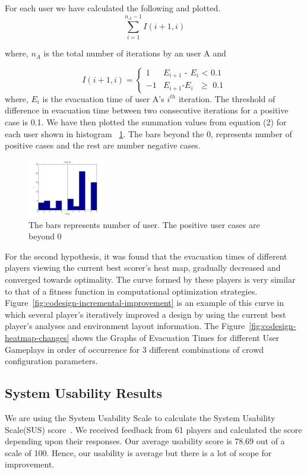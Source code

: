For each user we have calculated the following and plotted.
    \begin{equation}
\sum_{i=1}^{n_{A}-1} I(i+1,i)
 \end{equation}
    
    where, $n_{A}$ is the total number of iterations by an user A and
    
    \begin{equation*}
I(i+1,i) = \begin{cases}
1 &\text{$E_{i+1}$ - $E_{i}$ < 0.1}\  \\  -1 &\text{$E_{i+1}$-$E_{i}$ $\geq$ 0.1}
\end{cases}
\end{equation*}
where, $E_{i}$ is the evacuation time of user A's $i^{th}$ iteration. The threshold of difference in evacuation time between two consecutive iterations for a positive case is 0.1. We have then plotted the summation values from equation (2) for each user shown in histogram ~\ref{fig:histogram-of- positive-use-cases}. The bars beyond the 0, represents number of positive cases and the rest are number negative cases.

\begin{figure}
\centering
	\includegraphics[width=0.3\textwidth]{images/ValueofI-Histogram.jpg} 
  \caption{\label{fig:histogram-of- positive-use-cases}The bars represents number of user. The positive user cases are beyond 0}
\end{figure}


For the second hypothesis, it was found that the evacuation times of different players viewing the current best scorer's heat map, gradually decreased and converged towards optimality. The curve formed by these players is very similar to that of a fitness function in computational optimization strategies. Figure~\ref{fig:codesign-incremental-improvement} is an example of this curve in which several player's iteratively improved a design by using the current best player's analyses and environment layout information. The Figure~\ref{fig:codesign-heatmap-changes} shows the Graphs of Evacuation Times for different User Gameplays in order of occurrence for 3 different combinations of crowd configuration parameters. 



\subsection{System Usability Results}
We are using the System Usability Scale to calculate the System Usability Scale(SUS) score~\cite{JBrookeSUS}. We received feedback from 61 players and calculated the score depending upon their responses. Our average usability score is 78.69 out of a scale of 100. Hence, our usability is average but there is a lot of scope for improvement.








